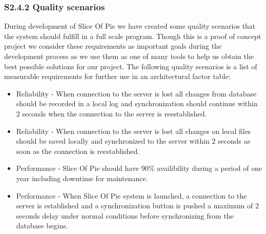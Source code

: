 \subsubsection{S2.4.2 Quality scenarios}
During development of Slice Of Pie we have created some quality scenarios that the system should fulfill in a full scale program. Though this is a proof of concept project we consider these requirements as important goals during the development process as we use them as one of many tools to help us obtain the best possible solutions for our project.
The following quality scenarios is a list of measurable requirements for further use in an architectural factor table:
\begin{itemize}
\item Reliability -  When connection to the server is lost all changes from database should be recorded in a local log and synchronization should continue within 2 seconds when the connection to the server is reestablished.
\item Reliability - When connection to the server is lost all changes on local files should be saved locally and synchronized to the server within 2 seconds as soon as the connection is reestablished.
\item Performance - Slice Of Pie should have 90\% availibility during a period of one year including downtime for  maintenance.
\item Performance - When Slice Of Pie system is launched, a connection to the server is established and a synchronization button is pushed a maximum of 2 seconds delay under normal conditions before synchronizing from the database begins.
\end{itemize}